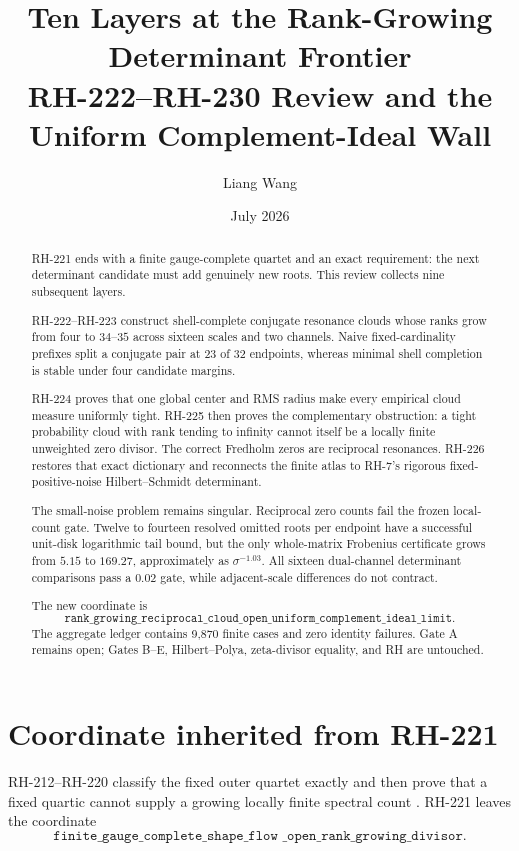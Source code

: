 \documentclass[11pt]{article}
\title{Ten Layers at the Rank-Growing Determinant Frontier\\
\large RH-222--RH-230 Review and the Uniform Complement-Ideal Wall}
\author{Liang Wang}
\date{July 2026}
\theoremstyle{remark}\newtheorem{remark}[theorem]{Remark}
\begin{document}
\maketitle

\begin{abstract}
RH-221 ends with a finite gauge-complete quartet and an exact requirement:
the next determinant candidate must add genuinely new roots. This review
collects nine subsequent layers.

RH-222--RH-223 construct shell-complete conjugate resonance clouds whose ranks
grow from four to $34$--$35$ across sixteen scales and two channels. Naive
fixed-cardinality prefixes split a conjugate pair at 23 of 32 endpoints,
whereas minimal shell completion is stable under four candidate margins.

RH-224 proves that one global center and RMS radius make every empirical cloud
measure uniformly tight. RH-225 then proves the complementary obstruction:
a tight probability cloud with rank tending to infinity cannot itself be a
locally finite unweighted zero divisor. The correct Fredholm zeros are
reciprocal resonances. RH-226 restores that exact dictionary and reconnects
the finite atlas to RH-7's rigorous fixed-positive-noise
Hilbert--Schmidt determinant.

The small-noise problem remains singular. Reciprocal zero counts fail the
frozen local-count gate. Twelve to fourteen resolved omitted roots per
endpoint have a successful unit-disk logarithmic tail bound, but the only
whole-matrix Frobenius certificate grows from $5.15$ to $169.27$, approximately
as $\sigma^{-1.03}$. All sixteen dual-channel determinant comparisons pass a
$0.02$ gate, while adjacent-scale differences do not contract.

The new coordinate is
\[
\texttt{rank\_growing\_reciprocal\_cloud\_open\_uniform\_complement\_ideal\_limit}.
\]
The aggregate ledger contains 9,870 finite cases and zero identity failures.
Gate A remains open; Gates B--E, Hilbert--Polya, zeta-divisor equality, and RH
are untouched.
\end{abstract}

\section{Coordinate inherited from RH-221}

RH-212--RH-220 classify the fixed outer quartet exactly and then prove that a
fixed quartic cannot supply a growing locally finite spectral count
\citep{WangRH219,WangRH221}. RH-221 leaves the coordinate
\begin{equation}\label{eq:old}
 \texttt{finite\_gauge\_complete\_shape\_flow
 \_open\_rank\_growing\_divisor}.
\end{equation}
\end{document}
